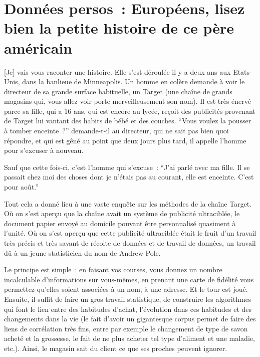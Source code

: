 \section{Données persos : Européens, lisez bien la petite histoire de ce père américain}

[Je] vais vous raconter une histoire. Elle s'est déroulée il y a deux ans aux Etats-Unis, dans la banlieue de Minneapolis. Un homme en colère demande à voir le directeur de sa grande surface habituelle, un Target (une chaîne de grands magasins qui, vous allez voir porte merveilleusement son nom). Il est très énervé parce sa fille, qui a 16 ans, qui est encore au lycée, reçoit des publicités provenant de Target lui vantant des habits de bébé et des couches. \enquote{Vous voulez la pousser à tomber enceinte ?} demande-t-il au directeur, qui ne sait pas bien quoi répondre, et qui est gêné au point que deux jours plus tard, il appelle l'homme pour s'excuser à nouveau.

Sauf que cette fois-ci, c'est l'homme qui s'excuse : \enquote{J'ai parlé avec ma fille. Il se passait chez moi des choses dont je n'étais pas au courant, elle est enceinte. C'est pour août.}

Tout cela a donné lieu à une vaste enquête sur les méthodes de la chaîne Target. Où on s'est aperçu que la chaîne avait un système de publicité ultraciblée, le document papier envoyé au domicile pouvant être personnalisé quasiment à l'unité. Où on s'est aperçu que cette publicité ultraciblée était le fruit d'un travail très précis et très savant de récolte de données et de travail de données, un travail dû à un jeune statisticien du nom de Andrew Pole.

Le principe est simple : en faisant vos courses, vous donnez un nombre incalculable d'informations sur vous-mêmes, en prenant une carte de fidélité vous permettez qu'elles soient associées à un nom, à une adresse. Et le tour est joué. Ensuite, il suffit de faire un gros travail statistique, de construire les algorithmes qui font le lien entre des habitudes d'achat, l'évolution dans ces habitudes et des changements dans la vie (le fait d'avoir un gigantesque corpus permet de faire des liens de corrélation très fins, entre par exemple le changement de type de savon acheté et la grossesse, le fait de ne plus acheter tel type d'aliment et une maladie, etc.). Ainsi, le magasin sait du client ce que ses proches peuvent ignorer.

